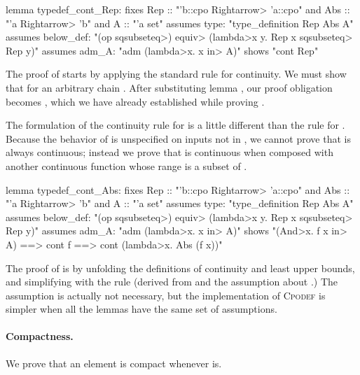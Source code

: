 \begin{isacode}
lemma typedef_cont_Rep:
  fixes Rep :: "'b::cpo \<Rightarrow> 'a::cpo" and Abs :: "'a \<Rightarrow> 'b" and A :: "'a set"
  assumes type: "type_definition Rep Abs A"
  assumes below_def: "(op \<sqsubseteq>) \<equiv> (\<lambda>x y. Rep x \<sqsubseteq> Rep y)"
  assumes adm_A: "adm (\<lambda>x. x \<in> A)"
  shows "cont Rep"
\end{isacode}

\noindent
The proof of  starts by applying the standard rule for continuity. We must show that  for an arbitrary chain . After substituting lemma , our proof obligation becomes , which we have already established while proving .

The formulation of the continuity rule for  is a little different than the rule for . Because the behavior of  is unspecified on inputs not in , we cannot prove that  is always continuous; instead we prove that  is continuous when composed with another continuous function  whose range is a subset of .

\begin{isacode}
lemma typedef_cont_Abs:
  fixes Rep :: "'b::cpo \<Rightarrow> 'a::cpo" and Abs :: "'a \<Rightarrow> 'b" and A :: "'a set"
  assumes type: "type_definition Rep Abs A"
  assumes below_def: "(op \<sqsubseteq>) \<equiv> (\<lambda>x y. Rep x \<sqsubseteq> Rep y)"
  assumes adm_A: "adm (\<lambda>x. x \<in> A)"
  shows "(\<And>x. f x \<in> A) ==> cont f ==> cont (\<lambda>x. Abs (f x))"
\end{isacode}

\noindent
The proof of  is by unfolding the definitions of continuity and least upper bounds, and simplifying with the rule  (derived from  and the assumption about .) The assumption  is actually not necessary, but the implementation of \textsc{Cpodef} is simpler when all the lemmas have the same set of assumptions.

\paragraph{Compactness.} We prove that an element  is compact whenever  is.

